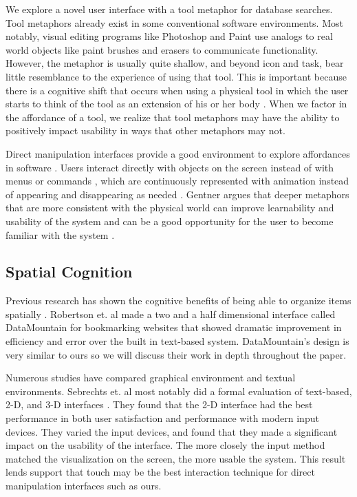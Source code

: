 \documentclass{article}
\begin{document}
We explore a novel user interface with a tool metaphor for database searches.  Tool metaphors already exist in some conventional software environments.  Most notably, visual editing programs like Photoshop and Paint use analogs to real world objects like paint brushes and erasers to communicate functionality.  However, the metaphor is usually quite shallow, and beyond icon and task, bear little resemblance to the experience of using that tool.  This is important because there is a cognitive shift that occurs when using a physical tool in which the user starts to think of the tool as an extension of his or her body  \cite{Maravita2004}.  When we factor in the affordance of a tool, we realize that tool metaphors may have the ability to positively impact usability in ways that other metaphors may not.  

Direct manipulation interfaces provide a good environment to explore affordances in software \cite{Gaver1991} \cite{Norman1991}.  Users interact directly with objects on the screen instead of with menus or commands \cite{Hutchins1989} \cite{Shneiderman1992}, which are continuously represented with animation instead of appearing and disappearing as needed \cite{Shneiderman1992}.  Gentner argues that deeper metaphors that are more consistent with the physical world can improve learnability and usability of the system \cite{Gentner1996} and can be a good opportunity for the user to become familiar with the system \cite{Fischer1994}.  


\subsection{Spatial Cognition}
Previous research has shown the cognitive benefits of being able to organize items spatially \cite{Agarawala2006} \cite{Robertson1998}. Robertson et. al made a two and a half dimensional interface called DataMountain for bookmarking websites that showed dramatic improvement in efficiency and error over the built in text-based system.  DataMountain's design is very similar to ours so we will discuss their work in depth throughout the paper.    
	
	Numerous studies have compared graphical environment and textual environments.  Sebrechts et. al most notably did a formal evaluation of text-based, 2-D, and 3-D interfaces \cite{Sebrechts1999}.  They found that the 2-D interface had the best performance in both user satisfaction and performance with modern input devices.  They varied the input devices, and found that they made a significant impact on the usability of the interface. The more closely the input method matched the visualization on the screen, the more usable the system.  This result lends support that touch may be the best interaction technique for direct manipulation interfaces such as ours.  
\end{document}
